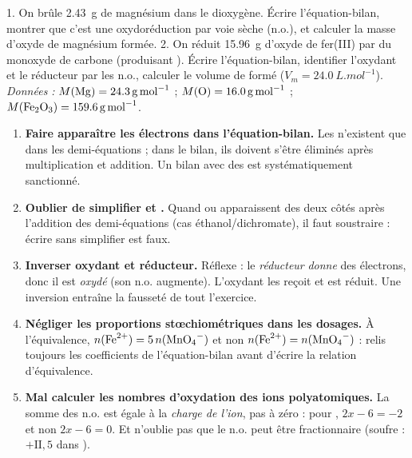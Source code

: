 \documentclass[11pt]{article}
\begin{document}
\begin{exercice}
1. On brûle \SI{2,43}{g} de magnésium dans le dioxygène. Écrire l'équation-bilan, montrer que c'est une oxydoréduction par voie sèche (n.o.), et calculer la masse d'oxyde de magnésium formée.
2. On réduit \SI{15,96}{g} d'oxyde de fer(III)  par du monoxyde de carbone  (produisant ). Écrire l'équation-bilan, identifier l'oxydant et le réducteur par les n.o., calculer le volume de  formé ($V_m = \SI{24,0}{L.mol^{-1}}$).
\emph{Données :} $M(\ce{Mg}) = \SI{24,3}{g.mol^{-1}}$ ; $M(\ce{O}) = \SI{16,0}{g.mol^{-1}}$ ; $M(\ce{Fe2O3}) = \SI{159,6}{g.mol^{-1}}$.
\end{exercice}

\begin{attention}
\begin{enumerate}
\item \textbf{Faire apparaître les électrons dans l'équation-bilan.} Les  n'existent que dans les demi-équations ; dans le bilan, ils doivent s'être éliminés après multiplication et addition. Un bilan avec des  est systématiquement sanctionné.
\item \textbf{Oublier de simplifier  et .} Quand  ou  apparaissent des deux côtés après l'addition des demi-équations (cas éthanol/dichromate), il faut soustraire : écrire  sans simplifier est faux.
\item \textbf{Inverser oxydant et réducteur.} Réflexe : le \emph{réducteur} \emph{donne} des électrons, donc il est \emph{oxydé} (son n.o. augmente). L'oxydant les reçoit et est réduit. Une inversion entraîne la fausseté de tout l'exercice.
\item \textbf{Négliger les proportions stœchiométriques dans les dosages.} À l'équivalence, $n(\ce{Fe^{2+}}) = 5\,n(\ce{MnO4^{-}})$ et non $n(\ce{Fe^{2+}}) = n(\ce{MnO4^{-}})$ : relis toujours les coefficients de l'équation-bilan avant d'écrire la relation d'équivalence.
\item \textbf{Mal calculer les nombres d'oxydation des ions polyatomiques.} La somme des n.o. est égale à la \emph{charge de l'ion}, pas à zéro : pour , $2x - 6 = -2$ et non $2x - 6 = 0$. Et n'oublie pas que le n.o. peut être fractionnaire (soufre : $+\mathrm{II{,}5}$ dans ).
\end{enumerate}
\end{attention}
\end{document}
